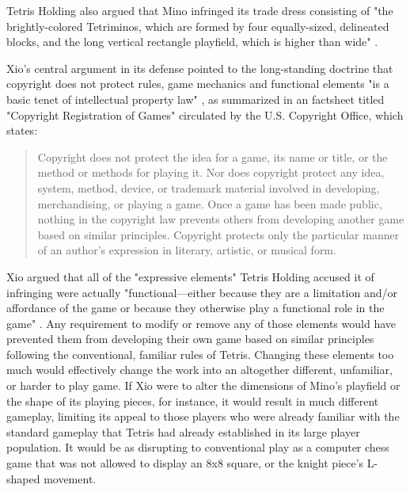 Tetris Holding also argued that Mino infringed its trade dress consisting of "the brightly-colored Tetriminos, which are formed by four equally-sized, delineated blocks, and the long vertical rectangle playfield, which is higher than wide" \autocite[415]{tetris-xio}.

Xio's central argument in its defense pointed to the long-standing doctrine that copyright does not protect rules, game mechanics and functional elements "is a basic tenet of intellectual property law" \autocite[6]{xio-summary}, as summarized in an factsheet titled "Copyright Registration of Games" circulated by the U.S. Copyright Office, which states:
\blockquote{
  Copyright does not protect the idea for a game, its name or title, or the method or methods for playing it. Nor does copyright protect any idea, system, method, device, or trademark material involved in developing, merchandising, or playing a game. Once a game has been made public, nothing in the copyright law prevents others from developing another game based on similar principles. Copyright protects only the particular manner of an author's expression in literary, artistic, or musical form. \autocite[qtd. in][6-7]{xio-summary}
  }

Xio argued that all of the "expressive elements" Tetris Holding accused it of infringing were actually "functional---either because they are a limitation and/or affordance of the game or because they otherwise play a functional role in the game" \autocite[42]{xio-summary}. Any requirement to modify or remove any of those elements would have prevented them from developing their own game based on similar principles following the conventional, familiar rules of Tetris. Changing these elements too much would effectively change the work into an altogether different, unfamiliar, or harder to play game. If Xio were to alter the dimensions of Mino's playfield or the shape of its playing pieces, for instance, it would result in much different gameplay, limiting its appeal to those players who were already familiar with the standard gameplay that Tetris had already established in its large player population. It would be as disrupting to conventional play as a computer chess game that was not allowed to display an 8x8 square, or the knight piece's L-shaped movement.

